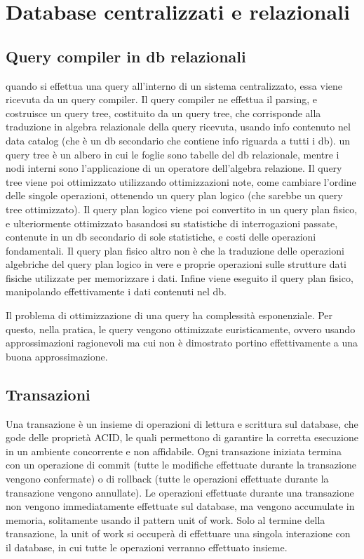 \chapter{Database centralizzati e relazionali}
\section{Query compiler in db relazionali}
quando si effettua una query all'interno di un sistema centralizzato, essa viene
ricevuta da un query compiler. Il query compiler ne effettua il parsing,
e costruisce un query tree, costituito da un query tree,
che corrisponde alla traduzione in algebra relazionale
della query ricevuta, usando info contenuto nel data catalog (che è un db secondario
che contiene info riguarda a tutti i db). un query tree è un albero in cui
le foglie sono tabelle del db relazionale, mentre i nodi interni sono l'applicazione
di un operatore dell'algebra relazione.
Il query tree viene poi ottimizzato utilizzando ottimizzazioni
note, come cambiare l'ordine delle singole operazioni, ottenendo un query plan
logico (che sarebbe un query tree ottimizzato).
Il query plan logico viene poi convertito in un query plan fisico, e ulteriormente
ottimizzato basandosi su statistiche di interrogazioni passate, contenute
in un db secondario di sole statistiche, e costi delle operazioni fondamentali.
Il query plan fisico altro non è che
la traduzione delle operazioni algebriche del query plan logico in
vere e proprie operazioni sulle strutture dati fisiche utilizzate per memorizzare i dati.
Infine viene eseguito il query plan fisico, manipolando effettivamente i dati
contenuti nel db.

Il problema di ottimizzazione di una query ha complessità esponenziale.
Per questo, nella pratica, le query vengono ottimizzate euristicamente,
ovvero usando approssimazioni ragionevoli ma cui non è dimostrato portino
effettivamente a una buona approssimazione.

\section{Transazioni}
Una transazione è un insieme di operazioni di lettura e scrittura sul database,
che gode delle proprietà ACID, le quali permettono di garantire la corretta esecuzione
in un ambiente concorrente e non affidabile.
Ogni transazione iniziata termina con un operazione di commit (tutte le modifiche
effettuate durante la transazione vengono confermate) o di rollback (tutte le
operazioni effettuate durante la transazione vengono annullate).
Le operazioni effettuate durante una transazione non vengono immediatamente
effettuate sul database, ma vengono accumulate in memoria, solitamente usando
il pattern unit of work. Solo al termine della transazione, la unit of work
si occuperà di effettuare una singola interazione con il database, in cui
tutte le operazioni verranno effettuato insieme.

